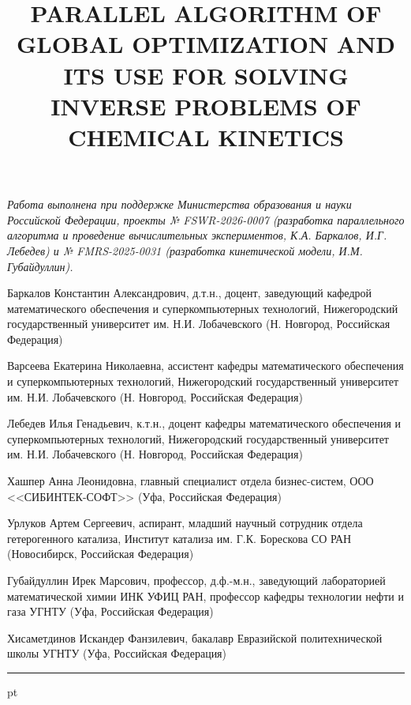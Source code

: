 \documentclass{cmi}
\begin{document}
\vspace{1em}
{\it Работа выполнена при поддержке Министерства образования и науки Российской Федерации, проекты № FSWR-2026-0007 (разработка параллельного алгоритма и проведение вычислительных экспериментов, К.А. Баркалов, И.Г. Лебедев) и № FMRS-2025-0031 (разработка кинетической модели, И.М. Губайдуллин).}


\insertbiblio

Баркалов Константин Александрович, д.т.н., доцент, заведующий кафедрой математического обеспечения и суперкомпьютерных технологий, Нижегородский государственный университет им. Н.И. Лобачевского (Н. Новгород, Российская Федерация)

Варсеева Екатерина Николаевна, ассистент кафедры математического обеспечения и суперкомпьютерных технологий, Нижегородский государственный университет им. Н.И. Лобачевского (Н. Новгород, Российская Федерация)

Лебедев Илья Генадьевич, к.т.н., доцент кафедры математического обеспечения и суперкомпьютерных технологий, Нижегородский государственный университет им. Н.И. Лобачевского (Н. Новгород, Российская Федерация)

Хашпер Анна Леонидовна, главный специалист отдела бизнес-систем, ООО <<СИБИНТЕК-СОФТ>> (Уфа, Российская Федерация)

Урлуков Артем Сергеевич, аспирант, младший научный сотрудник отдела гетерогенного катализа, Институт катализа им. Г.К. Борескова СО РАН
(Новосибирск, Российская Федерация)

Губайдуллин Ирек Марсович, профессор, д.ф.-м.н., заведующий лабораторией математической химии ИНК УФИЦ РАН, профессор кафедры технологии нефти и газа УГНТУ
(Уфа, Российская Федерация)

Хисаметдинов Искандер Фанзилевич, бакалавр Евразийской политехнической школы УГНТУ (Уфа, Российская Федерация)


\newpage
{\phantom{eee} \hrule {} pt}
\classify{} %

\title{PARALLEL ALGORITHM OF GLOBAL OPTIMIZATION AND ITS USE FOR SOLVING INVERSE PROBLEMS OF CHEMICAL KINETICS}

\end{document}
